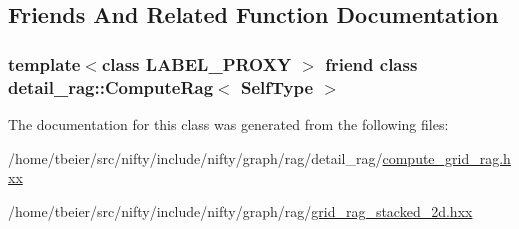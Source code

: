 \subsection{Friends And Related Function Documentation}
\hypertarget{classnifty_1_1graph_1_1GridRagStacked2D_abafcbd3543961eb6e4ee794aa6a62d66}{}
\subsubsection[{detail\+\_\+rag\+::\+Compute\+Rag$<$ Self\+Type $>$}]{\setlength{\rightskip}{0pt plus 5cm}template$<$class L\+A\+B\+E\+L\+\_\+\+P\+R\+O\+X\+Y $>$ friend class detail\+\_\+rag\+::\+Compute\+Rag$<$ {\bf Self\+Type} $>$\hspace{0.3cm}{\ttfamily [friend]}}\label{classnifty_1_1graph_1_1GridRagStacked2D_abafcbd3543961eb6e4ee794aa6a62d66}


The documentation for this class was generated from the following files\+:\begin{DoxyCompactItemize}
\item 
/home/tbeier/src/nifty/include/nifty/graph/rag/detail\+\_\+rag/\hyperlink{compute__grid__rag_8hxx}{compute\+\_\+grid\+\_\+rag.\+hxx}\item 
/home/tbeier/src/nifty/include/nifty/graph/rag/\hyperlink{grid__rag__stacked__2d_8hxx}{grid\+\_\+rag\+\_\+stacked\+\_\+2d.\+hxx}\end{DoxyCompactItemize}
